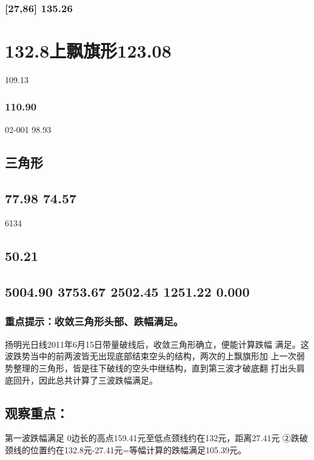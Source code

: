 \documentclass{article}
\begin{document}
\subsubsection{[27,86] 135.26}

\section{132.8上飘旗形123.08}

109.13

\subsubsection{110.90}

02-001 98.93

\subsection{三角形}

\subsection{77.98 74.57}

6134

\subsection{50.21}

\subsection{5004.90 3753.67 2502.45 1251.22 0.000}

\subsubsection{重点提示：收敛三角形头部、跌幅满足。}

扬明光日线2011年6月15日带量破线后，收敛三角形确立，便能计算跌幅 满足。这波跌势当中的前两波皆无出现底部结束空头的结构，两次的上飘旗形加 上一次弱势整理的三角形，皆是往下破线的空头中继结构，直到第三波才破底翻 打出头肩底回升，因此总共计算了三波跌幅满足。

\subsection{观察重点：}

第一波跌幅满足 0边长的高点159.41元至低点颈线约在132元，距离27.41元 ②跌破颈线的位置约在132.8元-27.41元=等幅计算的跌幅满足105.39元。
\end{document}
